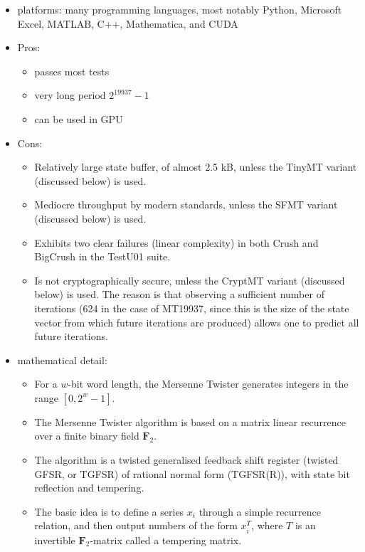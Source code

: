 \documentclass{article}
\begin{document}
            \begin{itemize}
                \item platforms: many programming languages, most notably Python\cite{Python}, Microsoft Excel\cite{Excel}, MATLAB\cite{MATLAB}, C++\cite{Cpp}, Mathematica\cite{Mathematica}, and CUDA\cite{CUDA}
                \item Pros:
                \begin{itemize}
                    \item passes most tests\cite{TestU01}
                    \item very long period $2^{19937} - 1$
                    \item can be used in GPU\cite{MTGP}
                \end{itemize}
                \item Cons:
                    \begin{itemize}
                        \item Relatively large state buffer, of almost 2.5 kB, unless the TinyMT variant (discussed below) is used.
                        \item Mediocre throughput by modern standards, unless the SFMT variant (discussed below) is used\cite{SFMT}.
                        \item Exhibits two clear failures (linear complexity) in both Crush and BigCrush in the TestU01 suite.\cite{TestU01}
                        \item Is not cryptographically secure, unless the CryptMT variant (discussed below) is used. The reason is that observing a sufficient number of iterations (624 in the case of MT19937, since this is the size of the state vector from which future iterations are produced) allows one to predict all future iterations.
                    \end{itemize}
                \item mathematical detail:
                    \begin{itemize}
                        \item For a $w$-bit word length, the Mersenne Twister generates integers in the range $[0, 2^w - 1]$.
                        \item The Mersenne Twister algorithm is based on a matrix linear recurrence over a finite binary field $\mathbf{F}_2$.
                        \item The algorithm is a twisted generalised feedback shift register\cite{TwistedGFSR} (twisted GFSR, or TGFSR) of rational normal form (TGFSR(R)), with state bit reflection and tempering.
                        \item The basic idea is to define a series $x_i$  through a simple recurrence relation, and then output numbers of the form $x_i^T$, where $T$ is an invertible $\mathbf{F}_2$-matrix called a tempering matrix.
                    \end{itemize}
            \end{itemize}
\end{document}
